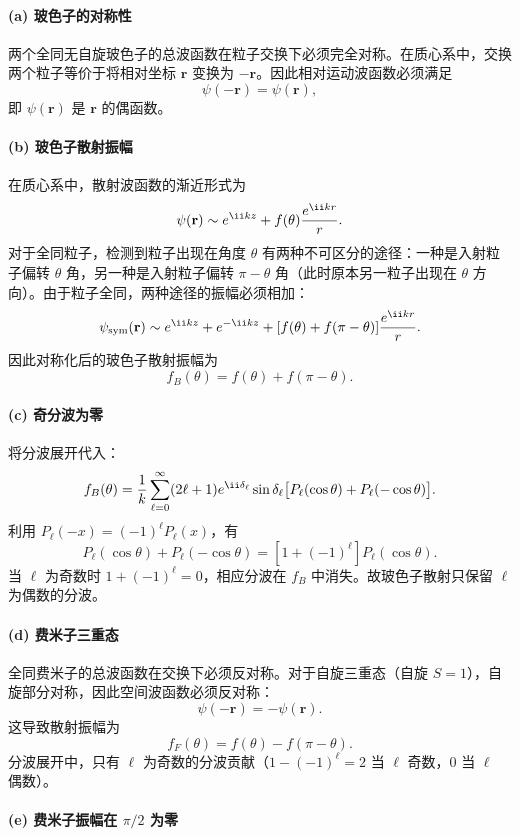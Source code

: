 \begin{solution}
\paragraph{(a) 玻色子的对称性}

两个全同无自旋玻色子的总波函数在粒子交换下必须完全对称。在质心系中，交换两个粒子等价于将相对坐标 $\mathbf r$ 变换为 $-\mathbf r$。因此相对运动波函数必须满足
\[
\psi(-\mathbf r)=\psi(\mathbf r),
\]
即 $\psi(\mathbf r)$ 是 $\mathbf r$ 的偶函数。

\paragraph{(b) 玻色子散射振幅}

在质心系中，散射波函数的渐近形式为
\[
\psi(\mathbf r)\sim e^{\ii kz}+f(\theta){e^{\ii kr}\over r}.
\]
对于全同粒子，检测到粒子出现在角度 $\theta$ 有两种不可区分的途径：一种是入射粒子偏转 $\theta$ 角，另一种是入射粒子偏转 $\pi-\theta$ 角（此时原本另一粒子出现在 $\theta$ 方向）。由于粒子全同，两种途径的振幅必须相加：
\[
\psi_{\text{sym}}(\mathbf r)\sim e^{\ii kz}+e^{-\ii kz}+[f(\theta)+f(\pi-\theta)]{e^{\ii kr}\over r}.
\]
因此对称化后的玻色子散射振幅为
\[
\boxed{f_B(\theta)=f(\theta)+f(\pi-\theta).}
\]

\paragraph{(c) 奇分波为零}

将分波展开代入：
\[
f_B(\theta)={1\over k}\sum_{\ell=0}^{\infty}(2\ell+1)e^{\ii\delta_\ell}\sin\delta_\ell\bigl[P_\ell(\cos\theta)+P_\ell(-\cos\theta)\bigr].
\]
利用 $P_\ell(-x)=(-1)^\ell P_\ell(x)$，有
\[
P_\ell(\cos\theta)+P_\ell(-\cos\theta)=[1+(-1)^\ell]P_\ell(\cos\theta).
\]
当 $\ell$ 为奇数时 $1+(-1)^\ell=0$，相应分波在 $f_B$ 中消失。故玻色子散射只保留 $\ell$ 为偶数的分波。

\paragraph{(d) 费米子三重态}

全同费米子的总波函数在交换下必须反对称。对于自旋三重态（自旋 $S=1$），自旋部分对称，因此空间波函数必须反对称：
\[
\psi(-\mathbf r)=-\psi(\mathbf r).
\]
这导致散射振幅为
\[
\boxed{f_F(\theta)=f(\theta)-f(\pi-\theta).}
\]
分波展开中，只有 $\ell$ 为奇数的分波贡献（$1-(-1)^\ell=2$ 当 $\ell$ 奇数，$0$ 当 $\ell$ 偶数）。

\paragraph{(e) 费米子振幅在 $\pi/2$ 为零}


\end{solution}
